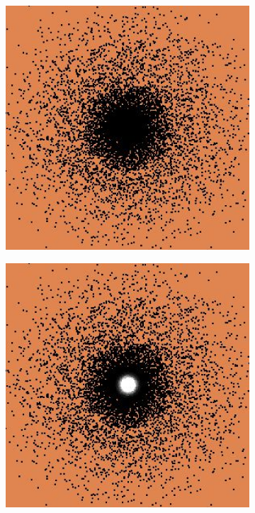 \documentclass [MS] {UCLAthesis}
\begin{document}
\begin{figure}
    \centering
    \begin{subfigure}{0.20\textwidth}
        \centering
        \includegraphics[width=\textwidth]{fixation2}
        \caption{}
    \end{subfigure}
    \hfill
    \centering
    \begin{subfigure}{0.20\textwidth}
        \centering
        \includegraphics[width=\textwidth]{fixation3}

\end{subfigure}
\end{figure}
\end{document}
